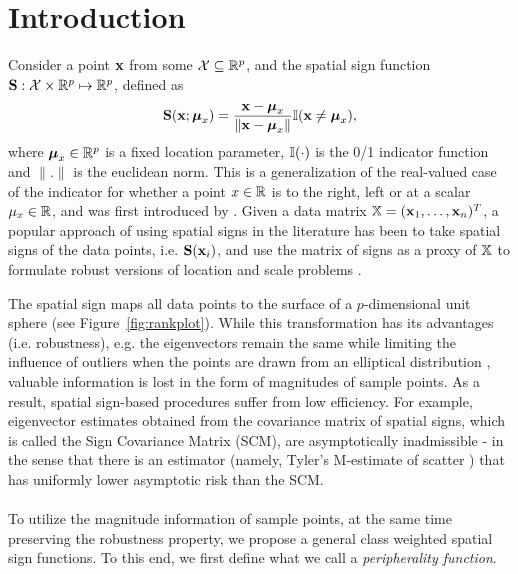 \section{Introduction}
\label{Section:SP}
 
Consider a point ${\bf{x}}$ from some $\mathcal{X} \subseteq {\mathbb{R}}^p$, and the spatial sign function ${\mathbf{S}} : \mathcal{X} \times {\mathbb{R}}^p \mapsto {\mathbb{R}}^p$, defined as
%
$$
{\mathbf{S}} ({\bf{x}}; {\boldsymbol{\mu}}_x) = \frac{{\bf{x}} - {\boldsymbol{\mu}}_x}{\| {\bf{x}} - {\boldsymbol{\mu}}_x \|}
{\mathbb{I}} ( {\bf{x}} \ne {\boldsymbol{\mu}}_x ),
$$
%
where ${\boldsymbol{\mu}}_x \in {\mathbb{R}}^p$ is a fixed location parameter, ${\mathbb{I}}(\cdot)$ is the 0/1 indicator function and $\|.\|$ is the euclidean norm. This is a generalization of the real-valued case of the indicator for whether a point $x \in {\mathbb{R}}$ is to the right, left or at a scalar $\mu_{x} \in {\mathbb{R}}$, and was first introduced by \cite{MottonenOja95}. Given a data matrix ${\mathbb{X}} = ({\bf{x}}_{1}, \ldots, {\bf{x}}_{n})^T$, a popular approach of using spatial signs in the literature has been to take spatial signs of the data points, i.e. ${\mathbf{S}}({\bf{x}}_i)$, and use the matrix of signs as a proxy of ${\mathbb{X}}$ to formulate robust versions of location and scale problems  \citep{locantore99, OjaBook10,WangPengLi15}.

The spatial sign maps all data points to the surface of a $p$-dimensional unit sphere (see Figure~\ref{fig:rankplot}). While this transformation has its advantages (i.e. robustness), e.g. the eigenvectors remain the same while limiting the influence of outliers when the points are drawn from an elliptical distribution \citep{taskinen12}, valuable information is lost in the form of magnitudes of sample points. As a result, spatial sign-based procedures suffer from low efficiency. For example, eigenvector estimates obtained from the covariance matrix of spatial signs, which is called the Sign Covariance Matrix (SCM), are asymptotically inadmissible \citep{magyar14}- in the sense that there is an estimator (namely, Tyler's M-estimate of scatter \citep{tyler87}) that has uniformly lower asymptotic risk than the SCM.

\paragraph{}
To utilize the magnitude information of sample points, at the same time preserving the robustness property, we propose a general class weighted spatial sign functions. To this end, we first define what we call a {\it peripherality function}.

